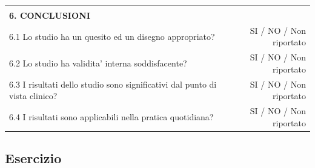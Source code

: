 \documentclass[]{book}
\begin{document}
\begin{longtable}[]{@{}lr@{}}
\begin{minipage}[t]{0.47\columnwidth}\raggedright
\strut
\end{minipage} & \begin{minipage}[t]{0.47\columnwidth}\raggedleft
\strut
\end{minipage}\tabularnewline
\begin{minipage}[t]{0.47\columnwidth}\raggedright
\textbf{6. CONCLUSIONI}\strut
\end{minipage} & \begin{minipage}[t]{0.47\columnwidth}\raggedleft
\strut
\end{minipage}\tabularnewline
\begin{minipage}[t]{0.47\columnwidth}\raggedright
6.1 Lo studio ha un quesito ed un disegno appropriato?\strut
\end{minipage} & \begin{minipage}[t]{0.47\columnwidth}\raggedleft
SI / NO / Non riportato\strut
\end{minipage}\tabularnewline
\begin{minipage}[t]{0.47\columnwidth}\raggedright
6.2 Lo studio ha validita' interna soddisfacente?\strut
\end{minipage} & \begin{minipage}[t]{0.47\columnwidth}\raggedleft
SI / NO / Non riportato\strut
\end{minipage}\tabularnewline
\begin{minipage}[t]{0.47\columnwidth}\raggedright
6.3 I risultati dello studio sono significativi dal punto di vista clinico?\strut
\end{minipage} & \begin{minipage}[t]{0.47\columnwidth}\raggedleft
SI / NO / Non riportato\strut
\end{minipage}\tabularnewline
\begin{minipage}[t]{0.47\columnwidth}\raggedright
6.4 I risultati sono applicabili nella pratica quotidiana?\strut
\end{minipage} & \begin{minipage}[t]{0.47\columnwidth}\raggedleft
SI / NO / Non riportato\strut
\end{minipage}\tabularnewline
\bottomrule
\end{longtable}

\hypertarget{esercizio-2}{%
\subsection{Esercizio}\label{esercizio-2}}
\end{document}
